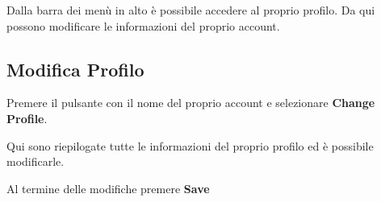Dalla barra dei menù in alto è possibile accedere al proprio profilo.
Da qui possono modificare le informazioni del proprio account.

\subsection{Modifica Profilo}

Premere il pulsante con il nome del proprio account e selezionare \textbf{Change Profile}.


\noindent Qui sono riepilogate tutte le informazioni del proprio profilo ed è possibile modificarle.

\noindent Al termine delle modifiche premere \textbf{Save}